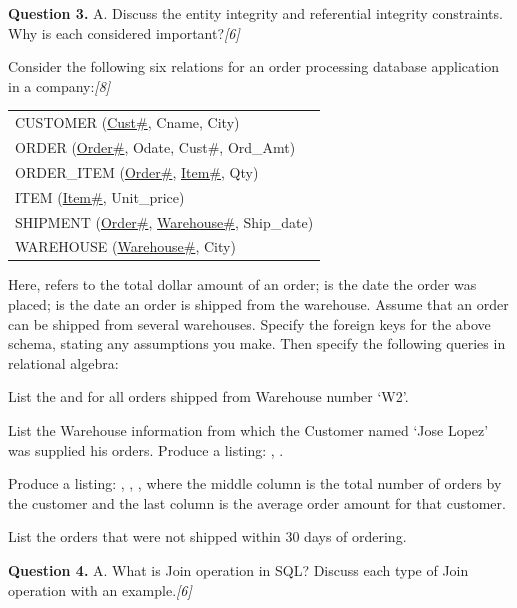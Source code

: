 \documentclass[11pt,a4paper]{article}
\newcommand{\pts}[1]{\hfill\textit{[#1]}}
\begin{document}
\medskip\noindent\textbf{Question 3.} A. Discuss the entity integrity and referential integrity constraints. Why is each considered important?\pts{6}
\begin{parts}
  \item Consider the following six relations for an order processing database application in a company:\pts{8}
  \begin{center}
    \begin{tabular}{l}
      CUSTOMER (\underline{Cust\#}, Cname, City) \\
      ORDER (\underline{Order\#}, Odate, Cust\#, Ord\_Amt) \\
      ORDER\_ITEM (\underline{Order\#}, \underline{Item\#}, Qty) \\
      ITEM (\underline{Item\#}, Unit\_price) \\
      SHIPMENT (\underline{Order\#}, \underline{Warehouse\#}, Ship\_date) \\
      WAREHOUSE (\underline{Warehouse\#}, City)
    \end{tabular}
  \end{center}
  Here,  refers to the total dollar amount of an order;  is the date the order was placed;  is the date an order is shipped from the warehouse. Assume that an order can be shipped from several warehouses. Specify the foreign keys for the above schema, stating any assumptions you make. Then specify the following queries in relational algebra:
  \begin{parts}
    \item List the  and  for all orders shipped from Warehouse number `W2'.
    \item List the Warehouse information from which the Customer named `Jose Lopez' was supplied his orders. Produce a listing: , .
    \item Produce a listing: , , , where the middle column is the total number of orders by the customer and the last column is the average order amount for that customer.
    \item List the orders that were not shipped within 30 days of ordering.
  \end{parts}
\end{parts}
\medskip\noindent\textbf{Question 4.} A. What is Join operation in SQL? Discuss each type of Join operation with an example.\pts{6}
\end{document}
